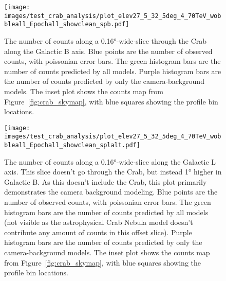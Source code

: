   \begin{figure}[h]
    \centering
    \texttt{[image: images/test\_crab\_analysis/plot\_elev27\_5\_32\_5deg\_4\_70TeV\_wobbleall\_Epochall\_showclean\_spb.pdf]}
    \caption[Crab Profile along Galactic B]
    {
      The number of counts along a \ang{0.16}-wide-slice through the Crab along the Galactic B axis.
      Blue points are the number of observed counts, with poissonian error bars.
      The green histogram bars are the number of counts predicted by all models.
      Purple histogram bars are the number of counts predicted by only the camera-background models.
      The inset plot shows the counts map from Figure~\ref{fig:crab_skymap}, with blue squares showing the profile bin locations.
    }
    \label{fig:crab_profile_b}
  \end{figure}
    
  \begin{figure}[h]
    \centering
    \texttt{[image: images/test\_crab\_analysis/plot\_elev27\_5\_32\_5deg\_4\_70TeV\_wobbleall\_Epochall\_showclean\_splalt.pdf]}
    \caption[Crab Profile along Galactic L Off Source]
    {
      The number of counts along a \ang{0.16}-wide-slice along the Galactic L axis.
      This slice doesn't go through the Crab, but instead \ang{1} higher in Galactic B.
      As this doesn't include the Crab, this plot primarily demonstrates the camera background modeling.
      Blue points are the number of observed counts, with poissonian error bars.
      The green histogram bars are the number of counts predicted by all models (not visible as the astrophysical Crab Nebula model doesn't contribute any amount of counts in this offset slice).
      Purple histogram bars are the number of counts predicted by only the camera-background models.
      The inset plot shows the counts map from Figure~\ref{fig:crab_skymap}, with blue squares showing the profile bin locations.
    }
    \label{fig:crab_profile_l_off}
  \end{figure}

